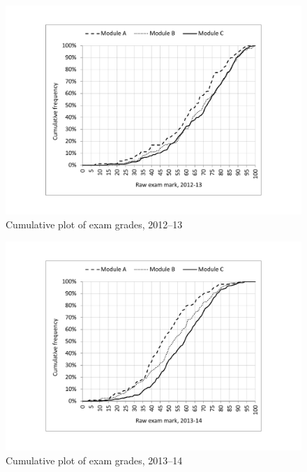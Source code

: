 \documentclass{amsart}
\begin{document}
\begin{center}
\begin{figure}[htb]
\includegraphics[bb=50 50 800 845,width=1\textwidth]{figure5.pdf}
\caption{Cumulative plot of exam grades, 2012--13}
\end{figure}
\end{center}


\begin{center}
\begin{figure}[htb]
\includegraphics[bb=50 50 800 845,width=1\textwidth]{figure6.pdf}
\caption{Cumulative plot of exam grades, 2013--14}
\end{figure}
\end{center}
\end{document}
